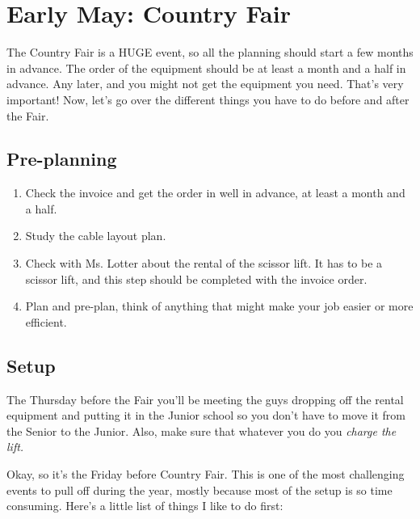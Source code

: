 \documentclass[letterpaper,10pt,oneside,headsepline]{scrreprt}
\begin{document}
\section{Early May: Country Fair}
The Country Fair is a HUGE event, so all the planning should start a few months in advance. The order of the equipment should be at least a month and a half in advance. Any later, and you might not get the equipment you need. That's very important! Now, let's go over the different things you have to do before and after the Fair.

\subsection{Pre-planning}
\begin{enumerate}
\item Check the invoice and get the order in well in advance, at least a month and a half.
\item Study the cable layout plan.
\item Check with Ms. Lotter about the rental of the scissor lift. It has to be a scissor lift, and this step should be completed with the invoice order.
\item Plan and pre-plan, think of anything that might make your job easier or more efficient.
\end{enumerate}

\subsection{Setup}
The Thursday before the Fair you'll be meeting the guys dropping off the rental equipment and putting it in the Junior school so you don't have to move it from the Senior to the Junior. Also, make sure that whatever you do you \textit{charge the lift.}

Okay, so it's the Friday before Country Fair. This is one of the most challenging events to pull off during the year, mostly because most of the setup is so time consuming. Here's a little list of things I like to do first:
\end{document}
